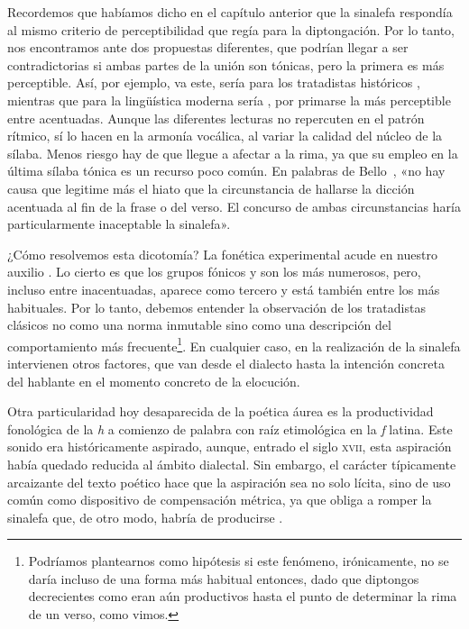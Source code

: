 Recordemos que habíamos dicho en el capítulo anterior que la sinalefa respondía al mismo criterio de perceptibilidad que regía para la diptongación. Por lo tanto, nos encontramos ante dos propuestas diferentes, que podrían llegar a ser contradictorias si ambas partes de la unión son tónicas, pero la primera es más perceptible. Así, por ejemplo, \textlangle{}va este\textrangle{}, sería para los tratadistas históricos , mientras que para la lingüística moderna sería , por primarse la más perceptible entre acentuadas. Aunque las diferentes lecturas no repercuten en el patrón rítmico, sí lo hacen en la armonía vocálica, al variar la calidad del núcleo de la sílaba. Menos riesgo hay de que llegue a afectar a la rima, ya que su empleo en la última sílaba tónica es un recurso poco común. En palabras de Bello~\parencite*[118]{bello1981}, «no hay causa que legitime más el hiato que la circunstancia de hallarse la dicción acentuada al fin de la frase o del verso. El concurso de ambas circunstancias haría particularmente inaceptable la sinalefa».

¿Cómo resolvemos esta dicotomía? La fonética experimental acude en nuestro auxilio \parencite{esgueva2004}. Lo cierto es que los grupos fónicos  y  son los más numerosos, pero, incluso entre inacentuadas, aparece como tercero  y  está también entre los más habituales. Por lo tanto, debemos entender la observación de los tratadistas clásicos no como una norma inmutable sino como una descripción del comportamiento más frecuente\footnote{Podríamos plantearnos como hipótesis si este fenómeno, irónicamente, no se daría incluso de una forma más habitual entonces, dado que diptongos decrecientes como  eran aún productivos hasta el punto de determinar la rima de un verso, como vimos.}. En cualquier caso, en la realización de la sinalefa intervienen otros factores, que van desde el dialecto hasta la intención concreta del hablante en el momento concreto de la elocución.

Otra particularidad hoy desaparecida de la poética áurea es la productividad fonológica de la \textit{h} a comienzo de palabra con raíz etimológica en la \textit{f} latina. Este sonido era históricamente aspirado, aunque, entrado el siglo \textsc{xvii}, esta aspiración había quedado reducida al ámbito dialectal. Sin embargo, el carácter típicamente arcaizante del texto poético hace que la aspiración sea no solo lícita, sino de uso común como dispositivo de compensación métrica, ya que obliga a romper la sinalefa que, de otro modo, habría de producirse \parencite[50]{quilis2013}. 

